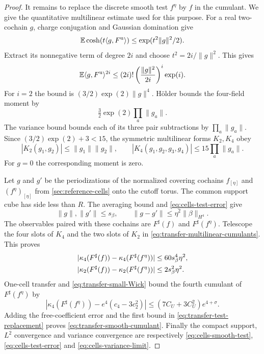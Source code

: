 \begin{proof}
It remains to replace the discrete smooth test
$f^\eta$ by $f$ in the cumulant. We give the
quantitative multilinear estimate used for this purpose.
For a real two-cochain $g$, charge conjugation and
Gaussian domination give
\[
 \mathbb E\cosh(t\langle g,F^{\mathrm u}\rangle)
                          \le\exp(t^2\|g\|^2/2).
\]
Extract its nonnegative term of degree $2i$ and choose
$t^2=2i/\|g\|^2$. This gives
\[
 \mathbb E\langle g,F^{\mathrm u}\rangle^{2i}
    \le(2i)!\left(\frac{\|g\|^2}{2i}\right)^i \exp(i).
\]
For $i=2$ the bound is $(3/2)\exp(2)\|g\|^4$.
H\"older bounds the four-field moment by
\[
 \tfrac32\exp(2)\prod_a\|g_a\|.
\]
The variance bound bounds each of its three pair subtractions
by $\prod_a\|g_a\|$. Since $(3/2)\exp(2)+3<15$,
the symmetric multilinear forms $K_2,K_4$ obey
\begin{equation}\label{eq:transfer-multilinear-cumulants}
 |K_2(g_1,g_2)|\le\|g_1\|\|g_2\|,\qquad
 |K_4(g_1,g_2,g_3,g_4)|\le15\prod_a\|g_a\|.
\end{equation}
For $g=0$ the corresponding moment is zero.

Let $g$ and $g'$ be the periodizations of the normalized
covering cochains $f_{[\eta]}$ and $(f^\eta)_{[\eta]}$
from \cref{sec:reference-cells} onto the cutoff torus.
The common support cube has side less than $R$.
The averaging bound and \eqref{eq:cells-test-error} give
\[
 \|g\|,\|g'\|\le s_\beta,\qquad
 \|g-g'\|\le\eta^2\|\beta\|_{H^4}.
\]
The observables paired with these cochains are
$F^\sharp(f)$ and $F^\sharp(f^\eta)$.
Telescope the four slots of $K_4$ and the two slots
of $K_2$ in \eqref{eq:transfer-multilinear-cumulants}.
This proves
\begin{align}
 |\kappa_4(F^\sharp(f))-\kappa_4(F^\sharp(f^\eta))|
                              &\le60s_\beta^4\eta^2,\notag\\
 |\kappa_2(F^\sharp(f))-\kappa_2(F^\sharp(f^\eta))|
                              &\le2s_\beta^2\eta^2.
                                   \label{eq:transfer-test-replacement}
\end{align}
One-cell transfer and \eqref{eq:transfer-small-Wick}
bound the fourth cumulant of $F^\sharp(f^\eta)$ by
\[
 |\kappa_4(F^\sharp(f^\eta))-e^4(c_4-3c_2^2)|
                     \le(7C_U+3C_U^2)e^{4+\sigma}.
\]
Adding the free-coefficient error and the first bound
in \eqref{eq:transfer-test-replacement} proves
\eqref{eq:transfer-smooth-cumulant}.
Finally the compact support, $L^2$ convergence and
variance convergence are respectively
\eqref{eq:cells-smooth-test}, \eqref{eq:cells-test-error}
and \eqref{eq:cells-variance-limit}.
\end{proof}


